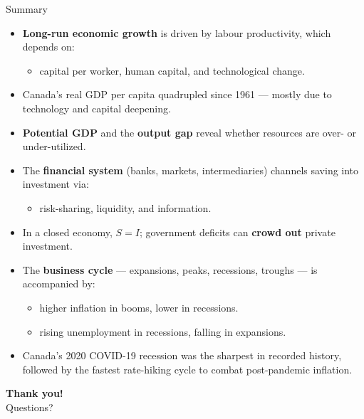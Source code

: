 \documentclass[aspectratio=169]{beamer}
\begin{document}
\begin{frame}{Summary}
\transfade
\begin{itemize}[<+->]
  \item \textbf{Long-run economic growth} is driven by \alert{labour productivity}, which depends on:
  \begin{itemize}[<+->]
    \item capital per worker, human capital, and technological change.
  \end{itemize}
  \item Canada's real GDP per capita quadrupled since 1961 --- mostly due to technology and capital deepening.
  \item \textbf{Potential GDP} and the \textbf{output gap} reveal whether resources are over- or under-utilized.
  \item The \textbf{financial system} (banks, markets, intermediaries) channels saving into investment via:
  \begin{itemize}[<+->]
    \item risk-sharing, liquidity, and information.
  \end{itemize}
  \item In a closed economy, $S = I$; government deficits can \textbf{crowd out} private investment.
  \item The \textbf{business cycle} --- expansions, peaks, recessions, troughs --- is accompanied by:
  \begin{itemize}[<+->]
    \item higher inflation in booms, lower in recessions.
    \item rising unemployment in recessions, falling in expansions.
  \end{itemize}
  \item Canada's 2020 COVID-19 recession was the sharpest in recorded history, followed by the fastest rate-hiking cycle to combat post-pandemic inflation.
\end{itemize}
\end{frame}

\begin{frame}
\centering
\Huge \textbf{Thank you!}\\[1em]
\large Questions?
\end{frame}
\end{document}
